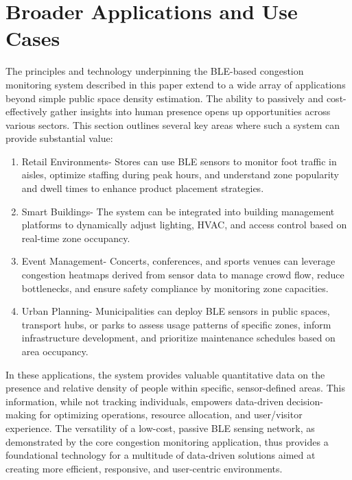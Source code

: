 \documentclass[runningheads]{llncs}
\begin{document}
\section{Broader Applications and Use Cases}
The principles and technology underpinning the BLE-based congestion monitoring system described in this paper extend to a wide array of applications beyond simple public space density estimation. The ability to passively and cost-effectively gather insights into human presence opens up opportunities across various sectors. This section outlines several key areas where such a system can provide substantial value:
\begin{enumerate}
    \item  Retail Environments-
    Stores can use BLE sensors to monitor foot traffic in aisles, optimize staffing during peak hours, and understand zone popularity and dwell times to enhance product placement strategies.

    \item  Smart Buildings-
    The system can be integrated into building management platforms to dynamically adjust lighting, HVAC, and access control based on real-time zone occupancy.

    \item  Event Management-
    Concerts, conferences, and sports venues can leverage congestion heatmaps derived from sensor data to manage crowd flow, reduce bottlenecks, and ensure safety compliance by monitoring zone capacities.

    \item  Urban Planning-
    Municipalities can deploy BLE sensors in public spaces, transport hubs, or parks to assess usage patterns of specific zones, inform infrastructure development, and prioritize maintenance schedules based on area occupancy.
\end{enumerate}


In these applications, the system provides valuable quantitative data on the presence and relative density of people within specific, sensor-defined areas. This information, while not tracking individuals, empowers data-driven decision-making for optimizing operations, resource allocation, and user/visitor experience.
The versatility of a low-cost, passive BLE sensing network, as demonstrated by the core congestion monitoring application, thus provides a foundational technology for a multitude of data-driven solutions aimed at creating more efficient, responsive, and user-centric environments.
\end{document}
